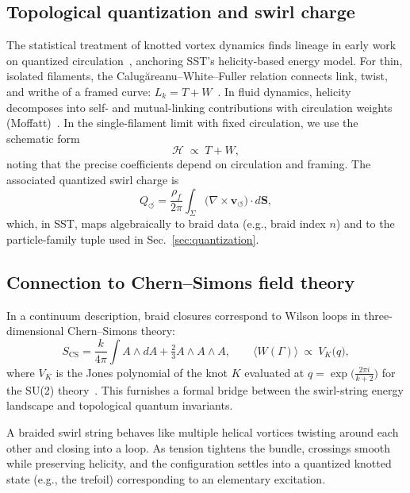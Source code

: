 \documentclass[10pt,reprint,aps,onecolumn,nofootinbib]{revtex4-2}
\begin{document}
    \subsection*{Topological quantization and swirl charge}
        The statistical treatment of knotted vortex dynamics finds lineage in early work on quantized circulation~\cite{Onsager1949}, anchoring SST’s helicity-based energy model.
        For thin, isolated filaments, the Calugăreanu–White–Fuller relation connects link, twist, and writhe of a framed curve: \(L_k = T + W\)~\cite{Calugareanu1959,White1969,Fuller1971}. In fluid dynamics, helicity decomposes into self- and mutual-linking contributions with circulation weights (Moffatt)~\cite{Moffatt1969}. In the single-filament limit with fixed circulation, we use the schematic form
        \[
            \mathcal{H} \;\propto\; T + W,
        \]
        noting that the precise coefficients depend on circulation and framing. The associated quantized swirl charge is
        \[
            Q_{\!\circlearrowleft} = \frac{\rho_f}{2\pi}\int_{\Sigma} \big(\nabla\times \mathbf{v}_{\!\boldsymbol{\circlearrowleft}}\big)\cdot d\mathbf{S},
        \]
        which, in SST, maps algebraically to braid data (e.g., braid index \(n\)) and to the particle-family tuple used in Sec.~\ref{sec:quantization}.

    \subsection*{Connection to Chern–Simons field theory}
        In a continuum description, braid closures correspond to Wilson loops in three-dimensional Chern–Simons theory:
        \[
            S_{\mathrm{CS}} = \frac{k}{4\pi}\int A\wedge dA + \tfrac{2}{3}A\wedge A\wedge A,\qquad
            \langle W(\Gamma)\rangle \ \propto\ V_K\!\big(q\big),
        \]
        where \(V_K\) is the Jones polynomial of the knot \(K\) evaluated at \(q=\exp\!\big(\frac{2\pi i}{k+2}\big)\) for the SU(2) theory~\cite{Witten1989}. This furnishes a formal bridge between the swirl-string energy landscape and topological quantum invariants.

        \begin{tcolorbox}[colback=gray!10,colframe=black,title={Physical Picture}]
            A braided swirl string behaves like multiple helical vortices twisting around each other and closing into a loop. As tension tightens the bundle, crossings smooth while preserving helicity, and the configuration settles into a quantized knotted state (e.g., the trefoil) corresponding to an elementary excitation.
        \end{tcolorbox}
\end{document}
